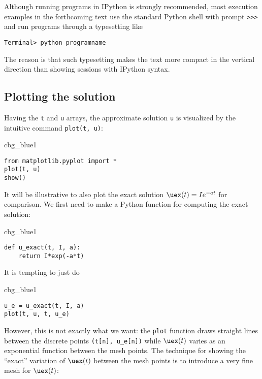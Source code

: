 \documentclass[graybox,sectrefs,envcountresetchap,open=right,final]{svmonodo}
\newenvironment{_cod_tight}[1]{
   \def\FrameCommand{\colorbox{#1}}
   \FrameRule0.6pt\MakeFramed {\FrameRestore}\vskip3mm}
   {\vskip0mm\endMakeFramed}
\newenvironment{cod}[1]{
\bgroup\rmfamily
\fboxsep=0mm\relax
\begin{_cod_tight}{#1}
\list{}{\parsep=-2mm\parskip=0mm\topsep=0pt\leftmargin=2mm
\rightmargin=2\leftmargin\leftmargin=4pt\relax}
\item\relax}
{\endlist\end{_cod_tight}\egroup}
\begin{document}
\noindent
Although running programs in IPython is strongly recommended, most
execution examples in the forthcoming text use the standard
Python shell with prompt \texttt{>>>} and run programs through
a typesetting like

\begin{Verbatim}[frame=lines,label=\fbox{{\tiny Terminal}},framesep=2.5mm,framerule=0.7pt,fontsize=\fontsize{9pt}{9pt}]
Terminal> python programname
\end{Verbatim}
The reason is that such typesetting
makes the text more compact in the vertical direction
than showing sessions with IPython syntax.

\label{decay:plotting}

\subsection{Plotting the solution}

Having the \texttt{t} and \texttt{u} arrays, the approximate solution \texttt{u} is visualized
by the intuitive command \texttt{plot(t, u)}:

\begin{cod}{cbg_blue1}\begin{Verbatim}[numbers=none,fontsize=\fontsize{9pt}{9pt},baselinestretch=0.95,xleftmargin=2mm]
from matplotlib.pyplot import *
plot(t, u)
show()
\end{Verbatim}
\end{cod}
\noindent
It will be illustrative to also plot the exact solution
$\uex(t)=Ie^{-at}$ for comparison. We first
need to make a Python function for computing the exact solution:

\begin{cod}{cbg_blue1}\begin{Verbatim}[numbers=none,fontsize=\fontsize{9pt}{9pt},baselinestretch=0.95,xleftmargin=2mm]
def u_exact(t, I, a):
    return I*exp(-a*t)
\end{Verbatim}
\end{cod}
\noindent
It is tempting to just do

\begin{cod}{cbg_blue1}\begin{Verbatim}[numbers=none,fontsize=\fontsize{9pt}{9pt},baselinestretch=0.95,xleftmargin=2mm]
u_e = u_exact(t, I, a)
plot(t, u, t, u_e)
\end{Verbatim}
\end{cod}
\noindent
However, this is not exactly what we want: the \texttt{plot} function draws
straight lines between the discrete points \Verb!(t[n], u_e[n])! while
$\uex(t)$ varies as an exponential function between the mesh points.
The technique for showing the ``exact'' variation of $\uex(t)$ between
the mesh points is to introduce a very fine mesh for $\uex(t)$:
\end{document}
